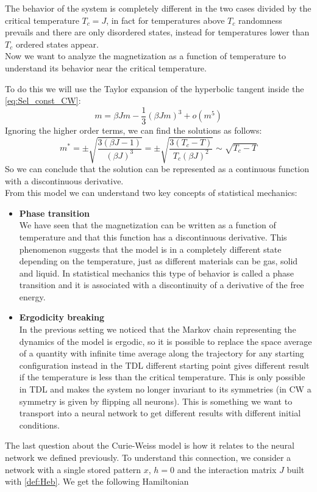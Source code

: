 The behavior of the system is completely different in the two cases divided by the critical temperature $T_c = J$, in fact for temperatures above $T_c$ randomness prevails and there are only disordered states, instead for temperatures lower than $T_c$ ordered states appear.  \\
Now we want to analyze the magnetization as a function of temperature to understand its behavior near the critical temperature.

\noindent To do this we will use the Taylor expansion of the hyperbolic tangent inside the \cref{eq:Sel_const_CW}:
\[
    m = \beta J m - \frac13 (\beta J m )^3 + o(m^5)
\]
Ignoring the higher order terms, we can find the solutions as follows:
\[
 m^* = \pm \sqrt{\frac{3(\beta J - 1)}{(\beta J)^3}} = \pm \sqrt{\frac{3(T_c-T)}{T_c (\beta J)^2}} \sim \sqrt{T_c-T}
\]
So we can conclude that the solution can be represented as a continuous function with a discontinuous derivative. \\ From this model we can understand two key concepts of statistical mechanics:
\begin{itemize}
	\item \textbf{Phase transition}\\
	We have seen that the magnetization can be written as a function of temperature and that this function has a
	discontinuous derivative. This phenomenon suggests that the model is in a completely different state depending on the temperature, just as different materials can be gas, solid and liquid. In statistical mechanics this type of behavior is called a phase transition and it is associated with a discontinuity of a derivative of the free energy.
	\item \textbf{Ergodicity breaking}\\
	In the previous setting we noticed that the Markov chain representing the dynamics of the model is ergodic, so it is possible to replace the space average of a quantity with infinite time average along the trajectory for any starting configuration instead in the TDL different starting point gives different result if the temperature is less than the critical temperature.
	This is only possible in TDL and makes the system no longer invariant to its symmetries (in CW a symmetry is given by flipping all neurons). This is something we want to transport into a neural network to get different results with different initial conditions.
\end{itemize}
The last question about the Curie-Weiss model is how it relates to the neural network we defined previously. To understand this connection, we consider a network with a single stored pattern $x$, $h=0$ and the interaction matrix $J$ built with \cref{def:Heb}. We get the following Hamiltonian
